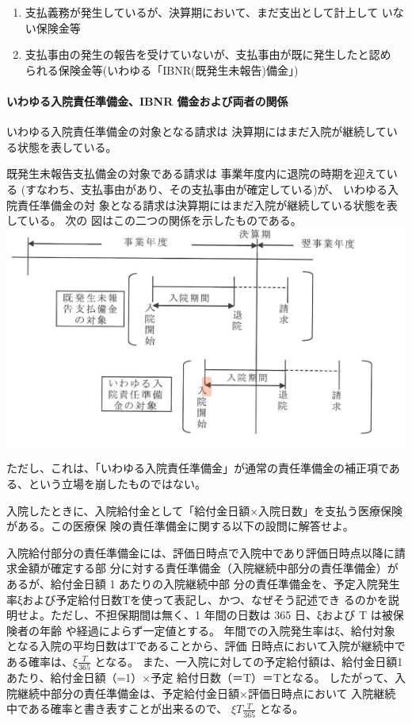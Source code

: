 \documentclass[report,gutter=10mm,fore-edge=10mm,uplatex,dvipdfmx]{jlreq}
\begin{document}
\begin{enumerate}
\item 支払義務が発生しているが、決算期において、まだ支出として計上して
いない保険金等
\item 支払事由の発生の報告を受けていないが、支払事由が既に発生したと認め
られる保険金等(いわゆる「IBNR(既発生未報告)備金」)
\end{enumerate}

\paragraph{いわゆる入院責任準備金、IBNR 備金および両者の関係}

いわゆる入院責任準備金の対象となる請求は
決算期にはまだ入院が継続している状態を表している。

既発生未報告支払備金の対象である請求は
事業年度内に退院の時期を迎えている
(すなわち、支払事由があり、その支払事由が確定している)が、
いわゆる入院責任準備金の対
象となる請求は決算期にはまだ入院が継続している状態を表している。
次の
図はこの二つの関係を示したものである。
\includegraphics[scale=0.8]{images/ProbH5-1-1-1.png}

ただし、これは、「いわゆる入院責任準備金」が通常の責任準備金の補正項である、という立場を崩したものではない。

入院したときに、入院給付金として「給付金日額×入院日数」を支払う医療保険がある。この医療保
険の責任準備金に関する以下の設問に解答せよ。

入院給付部分の責任準備金には、評価日時点で入院中であり評価日時点以降に請求金額が確定する部
分に対する責任準備金（入院継続中部分の責任準備金）があるが、給付金日額 1 あたりの入院継続中部
分の責任準備金を、予定入院発生率ξおよび予定給付日数Tを使って表記し、かつ、なぜそう記述でき
るのかを説明せよ。ただし、不担保期間は無く、1 年間の日数は 365 日、ξおよび T は被保険者の年齢
や経過によらず一定値とする。
年間での入院発生率はξ、給付対象となる入院の平均日数はTであることから、評価
日時点において入院が継続中である確率は、$\xi \frac{T}{365}$ となる。
また、一入院に対しての予定給付額は、給付金日額1あたり、給付金日額（=1）×予定
給付日数（＝T）＝Tとなる。
したがって、入院継続中部分の責任準備金は、予定給付金日額×評価日時点において
入院継続中である確率と書き表すことが出来るので、
$\xi T\frac{T}{365}$ となる。
\end{document}
